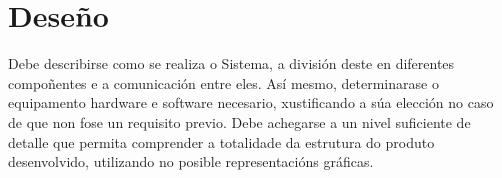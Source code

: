 \chapter{Deseño}

Debe describirse como se realiza o Sistema, a división deste en diferentes compoñentes e a comunicación entre eles.
Así mesmo, determinarase o equipamento hardware e software necesario, xustificando a súa elección no caso de que non fose
un requisito previo. Debe achegarse a un nivel suficiente de detalle que permita comprender a totalidade da estrutura do
produto desenvolvido, utilizando no posible representacións gráficas.